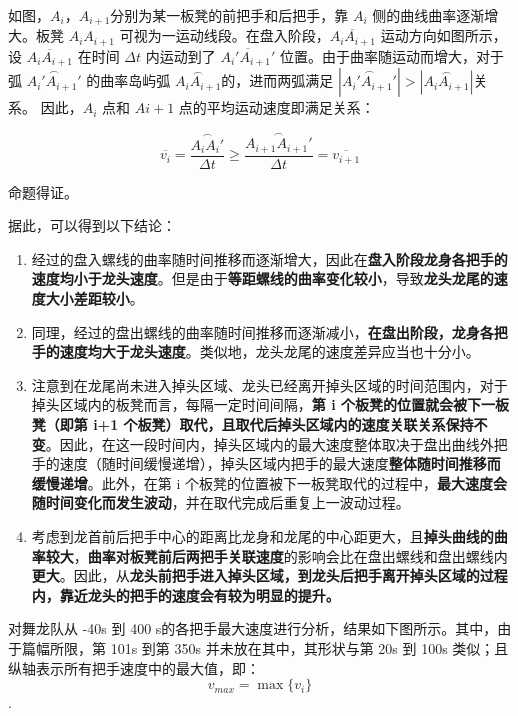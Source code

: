 \documentclass[a4paper]{article}
\begin{document}
		如图，$A_i$，$A_{i+1}$分别为某一板凳的前把手和后把手，靠 $A_i$ 侧的曲线曲率逐渐增大。板凳 $A_iA_{i+1}$ 可视为一运动线段。在盘入阶段，$\overline{A_iA_{i+1}}$ 运动方向如图所示，设 $\overline{A_iA_{i+1}}$ 在时间 $\Delta t$ 内运动到了 $\overline{A_i'A_{i+1}'}$ 位置。由于曲率随运动而增大，对于弧 $\overset{\frown}{A_i'A_{i+1}'}$ 的曲率岛屿弧 $ \overset{\frown}{A_iA_{i+1}} $的，进而两弧满足 $|\overset{\frown}{A_i'A_{i+1}'}| > |\overset{\frown}{A_iA_{i+1}}| $关系。 因此，$A_i$ 点和 $A{i+1}$ 点的平均运动速度即满足关系：
		
		\begin{equation}
			\overline{v_{i}} = \dfrac{\overset{\frown}{A_iA_i'}}{\Delta t} \ge
			\frac{\overset{\frown}{A_{i+1}A_{i+1}'}}{\Delta t} = \overline{v_{i+1}}
		\end{equation}
		
		命题得证。
		
		据此，可以得到以下结论：
		\begin{enumerate}
			\item 经过的盘入螺线的曲率随时间推移而逐渐增大，因此在\textbf{盘入阶段龙身各把手的速度均小于龙头速度}。但是由于\textbf{等距螺线的曲率变化较小}，导致\textbf{龙头龙尾的速度大小差距较小}。
			
			\item 同理，经过的盘出螺线的曲率随时间推移而逐渐减小，\textbf{在盘出阶段，龙身各把手的速度均大于龙头速度}。类似地，龙头龙尾的速度差异应当也十分小。
			
			\item 注意到在龙尾尚未进入掉头区域、龙头已经离开掉头区域的时间范围内，对于掉头区域内的板凳而言，每隔一定时间间隔，\textbf{第 i 个板凳的位置就会被下一板凳（即第 i+1 个板凳）取代，且取代后掉头区域内的速度关联关系保持不变}。因此，在这一段时间内，掉头区域内的最大速度整体取决于盘出曲线外把手的速度（随时间缓慢递增），掉头区域内把手的最大速度\textbf{整体随时间推移而缓慢递增}。此外，在第 i 个板凳的位置被下一板凳取代的过程中，\textbf{最大速度会随时间变化而发生波动}，并在取代完成后重复上一波动过程。
			
			\item 考虑到龙首前后把手中心的距离比龙身和龙尾的中心距更大，且\textbf{掉头曲线的曲率较大}，\textbf{曲率对板凳前后两把手关联速度}的影响会比在盘出螺线和盘出螺线内\textbf{更大}。因此，从\textbf{龙头前把手进入掉头区域，到龙头后把手离开掉头区域的过程内，靠近龙头的把手的速度会有较为明显的提升。}
		\end{enumerate}
		
		对舞龙队从 -40s 到 400 s的各把手最大速度进行分析，结果如下图所示。其中，由于篇幅所限，第 101s 到第 350s 并未放在其中，其形状与第 20s 到 100s 类似；且纵轴表示所有把手速度中的最大值，即：
		$$v_{max} = \max\{{v_i}\}$$.
		
\end{document}

